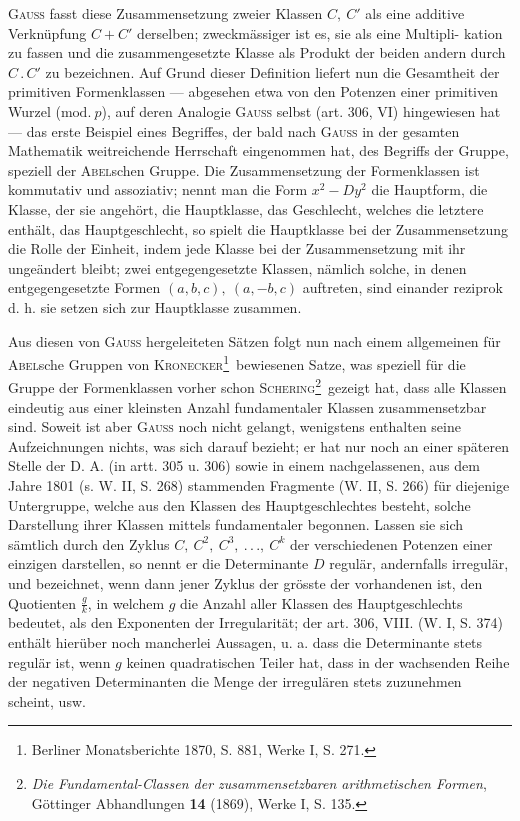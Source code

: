 \textsc{Gauss} fasst diese Zusammensetzung zweier Klassen \(C,\ C'\) als eine additive Verknüpfung \(C+C'\) derselben; zweckmässiger ist es, sie als eine Multipli-\newpage
{}
\noindent kation zu fassen und die zusammengesetzte Klasse als Produkt der beiden andern durch \(C\mathbin{.}C'\) zu bezeichnen. Auf Grund dieser Definition liefert nun die Gesamtheit der primitiven Formenklassen — abgesehen etwa von den Potenzen einer primitiven Wurzel (\(\mathrm{mod.}\ p\)), auf deren Analogie \textsc{Gauss} selbst (art. 306, VI) hingewiesen hat — das erste Beispiel eines Begriffes, der bald nach \textsc{Gauss} in der gesamten Mathematik weitreichende Herrschaft eingenommen hat, des Begriffs der Gruppe, speziell der \textsc{Abel}schen Gruppe. Die Zusammensetzung der Formenklassen ist kommutativ und assoziativ; nennt man die Form \(x^2-Dy^2\) die Hauptform, die Klasse, der sie angehört, die Hauptklasse, das Geschlecht, welches die letztere enthält, das Hauptgeschlecht, so spielt die Hauptklasse bei der Zusammensetzung die Rolle der Einheit, indem jede Klasse bei der Zusammensetzung mit ihr ungeändert bleibt; zwei entgegengesetzte Klassen, nämlich solche, in denen entgegengesetzte Formen \((a,b,c),\ (a,-b,c)\) auftreten, sind einander reziprok d. h. sie setzen sich zur Hauptklasse zusammen.

Aus diesen von \textsc{Gauss} hergeleiteten Sätzen folgt nun nach einem allgemeinen für \textsc{Abel}sche Gruppen von \textsc{Kronecker}\footnote{Berliner Monatsberichte 1870, S. 881, Werke I, S. 271.}\ bewiesenen Satze, was speziell für die Gruppe der Formenklassen vorher schon \textsc{Schering}\begingroup\renewcommand{\thefootnote}{**)}\footnote{\textit{Die Fundamental-Classen der zusammensetzbaren arithmetischen Formen}, Göttinger Abhandlungen \textbf{14} (1869), Werke I, S. 135.}\endgroup\ gezeigt hat, dass alle Klassen eindeutig aus einer kleinsten Anzahl fundamentaler Klassen zusammensetzbar sind. Soweit ist aber \textsc{Gauss} noch nicht gelangt, wenigstens enthalten seine Aufzeichnungen nichts, was sich darauf bezieht; er hat nur noch an einer späteren Stelle der D. A. (in artt. 305 u. 306) sowie in einem nachgelassenen, aus dem Jahre 1801 (s. W. II, S. 268) stammenden Fragmente (W. II, S. 266) für diejenige Untergruppe, welche aus den Klassen des Hauptgeschlechtes besteht, solche Darstellung ihrer Klassen mittels fundamentaler begonnen. Lassen sie sich sämtlich durch den Zyklus \(C,\ C^2,\ C^3,\ .\,.\,.,\ C^k\) der verschiedenen Potenzen einer einzigen darstellen, so nennt er die Determinante \(D\) regulär, andernfalls irregulär, und bezeichnet, wenn dann jener Zyklus der grösste der vorhandenen ist, den Quotienten \(\frac{g}{k}\), in welchem \(g\) die Anzahl aller Klassen des Hauptgeschlechts bedeutet, als den Exponenten der Irregularität; der art. 306, VIII. (W. I, S. 374) enthält hierüber noch mancherlei Aussagen,
\newpage{}
\noindent u. a. dass die Determinante stets regulär ist, wenn \(g\) keinen quadratischen Teiler hat, dass in der wachsenden Reihe der negativen Determinanten die Menge der irregulären stets zuzunehmen scheint, usw.
